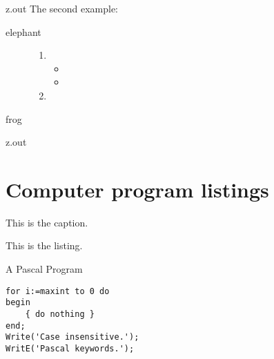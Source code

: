 \begin{VerbatimOut}{z.out}
The second example:

\begin{description}
  \item[elephant]
    \begin{enumerate}
      \item
      \begin{itemize}
        \item
        \item
      \end{itemize}
      \item
    \end{enumerate}
  \item[frog]
\end{description}
\end{VerbatimOut}

\MyIO


\begin{VerbatimOut}{z.out}


\section{Computer program listings}

\lstset{language=Pascal}

\begin{ZZlisting}
  \caption{This is the caption.}
  \begin{CenteredBox}
     This is the listing.
  \end{CenteredBox}
\end{ZZlisting}

\begin{ZZlisting}
  \caption{A Pascal Program}
  \begin{CenteredBox}
    \begin{lstlisting}
for i:=maxint to 0 do
begin
    { do nothing }
end;
Write('Case insensitive.');
WritE('Pascal keywords.');
    \end{lstlisting}
  \end{CenteredBox}
\end{ZZlisting}
\end{VerbatimOut}

